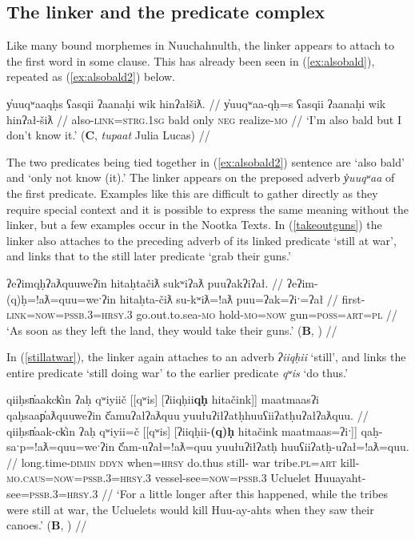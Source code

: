 \subsection{The linker and the predicate complex} \label{sec:link:2p}

Like many bound morphemes in Nuuchahnulth, the linker appears to attach to the first word in some clause. This has already been seen in (\ref{ex:alsobald}), repeated as (\ref{ex:alsobald2}) below.

\ex \label{ex:alsobald2}
\begingl
\glpreamble y̓uuqʷaaqḥs ʕasqii ʔaanaḥi wik hinʔałšiƛ. //
\gla y̓uuqʷaa-qḥ=s ʕasqii ʔaanaḥi wik hinʔał-šiƛ //
\glb also-\textsc{link}=\textsc{strg.1sg} bald only \textsc{neg} realize-\textsc{mo} //
\glft `I'm also bald but I don't know it.' (\textbf{C}, \textit{tupaat} Julia Lucas) //
\endgl
\xe

The two predicates being tied together in (\ref{ex:alsobald2}) sentence are `also bald' and `only not know (it).' The linker appears on the preposed adverb \textit{y̓uuqʷaa} of the first predicate.	 Examples like this are difficult to gather directly as they require special context and it is possible to express the same meaning without the linker, but a few examples occur in the Nootka Texts. In (\ref{takeoutguns}) the linker also attaches to the preceding adverb of its linked predicate `still at war', and links that to the still later predicate `grab their guns.'

\ex \label{takeoutguns}
\begingl
\glpreamble ʔeʔimqḥʔaƛquuweʔin hitaḥtačiƛ sukʷiʔaƛ puuʔakʔiʔał. //
\gla ʔeʔim-(q)ḥ=!aƛ=quu=weˑʔin hitaḥta-čiƛ su-kʷiƛ=!aƛ puu=ʔak=ʔiˑ=ʔał //
\glb first-\textsc{link}=\textsc{now}=\textsc{pssb.3}=\textsc{hrsy.3} go.out.to.sea-\textsc{mo} hold-\textsc{mo}=\textsc{now} gun=\textsc{poss}=\textsc{art}=\textsc{pl} //
\glft `As soon as they left the land, they would take their guns.' (\textbf{B}, \citealt[395]{sapir1955}) //
\endgl
\xe

In (\ref{stillatwar}), the linker again attaches to an adverb \textit{ʔiiqḥii} `still', and links the entire predicate `still doing war' to the earlier predicate \textit{qʷis} `do thus.'

\ex \label{stillatwar}
\begingl
\glpreamble qiiḥsn̓aakck̓in ʔaḥ qʷiyiič [[qʷis] [ʔiiqḥii\textbf{qḥ} hitačink]] maatmaasʔi qaḥsaap̓aƛquuweʔin č̓amuʔałʔaƛquu yuułuʔiłʔatḥ\footnotemark huuʕiiʔatḥuʔałʔaƛquu. //
\gla qiiḥsn̓aak-ck̓in ʔaḥ qʷiyii=č [[qʷis] [ʔiiqḥii-\textbf{(q)ḥ} hitačink maatmaas=ʔiˑ]] qaḥ-saˑp=!aƛ=quu=weˑʔin  č̓am-uʔał=!aƛ=quu yuułuʔiłʔatḥ huuʕiiʔatḥ-uʔał=!aƛ=quu. //
\glb long.time-\textsc{dimin} \textsc{ddyn} when=\textsc{hrsy} do.thus still- war tribe.\textsc{pl}=\textsc{art} kill-\textsc{mo.caus}=\textsc{now}=\textsc{pssb.3}=\textsc{hrsy.3} vessel-see=\textsc{now}=\textsc{pssb.3} Ucluelet Huuayaht-see=\textsc{pssb.3}=\textsc{hrsy.3} //
\glft `For a little longer after this happened, while the tribes were still at war, the Ucluelets would kill Huu-ay-ahts when they saw their canoes.' (\textbf{B}, \citealt[392]{sapir1955}) //
\endgl
\xe

